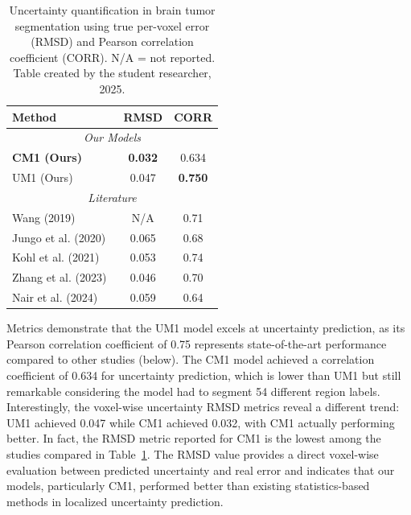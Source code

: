 \documentclass[11pt,letterpaper]{article}
\begin{document}
\begin{table}[htbp]
\centering
\caption{Uncertainty quantification in brain tumor segmentation using true per-voxel error (RMSD) and Pearson correlation coefficient (CORR). N/A = not reported. Table created by the student researcher, 2025.}
\label{tab:uq_corrected}
\begin{tabular}{l cc}
\toprule
\textbf{Method} & \textbf{RMSD} & \textbf{CORR} \\
\midrule
\multicolumn{3}{c}{\textit{Our Models}} \\
\midrule
\textbf{CM1 (Ours)} & \textbf{0.032} & 0.634 \\
UM1 (Ours) & 0.047 & \textbf{0.750} \\
\midrule
\multicolumn{3}{c}{\textit{Literature}} \\
\midrule
Wang (2019)~\cite{wang2019aleatoric} & N/A & 0.71 \\
Jungo et al. (2020)~\cite{jungo2020analyzing} & 0.065 & 0.68 \\
Kohl et al. (2021)~\cite{savadikar2021} & 0.053 & 0.74 \\
Zhang et al. (2023)~\cite{zhang2023} & 0.046 & 0.70 \\
Nair et al. (2024)~\cite{mehta2024} & 0.059 & 0.64 \\
\bottomrule
\end{tabular}
\end{table}
Metrics demonstrate that the UM1 model excels at uncertainty prediction, as its Pearson correlation coefficient of 0.75 represents state-of-the-art performance compared to other studies (below). The CM1 model achieved a correlation coefficient of 0.634 for uncertainty prediction, which is lower than UM1 but still remarkable considering the model had to segment 54 different region labels. Interestingly, the voxel-wise uncertainty RMSD metrics reveal a different trend: UM1 achieved 0.047 while CM1 achieved 0.032, with CM1 actually performing better. In fact, the RMSD metric reported for CM1 is the lowest among the studies compared in Table~\ref{tab:uq_corrected}. The RMSD value provides a direct voxel-wise evaluation between predicted uncertainty and real error and indicates that our models, particularly CM1, performed better than existing statistics-based methods in localized uncertainty prediction.
\end{document}
